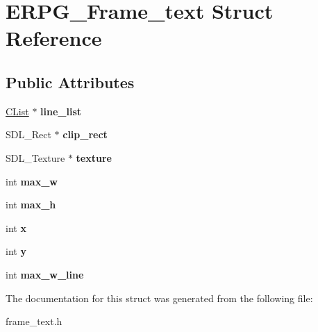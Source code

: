 \hypertarget{structERPG__Frame__text}{\section{E\-R\-P\-G\-\_\-\-Frame\-\_\-text Struct Reference}
\label{structERPG__Frame__text}
}
\subsection*{Public Attributes}
\begin{DoxyCompactItemize}
\item 
\hypertarget{structERPG__Frame__text_a578703ab0f77bb521e9c947e4c451767}{\hyperlink{structCList}{C\-List} $\ast$ {\bfseries line\-\_\-list}}\label{structERPG__Frame__text_a578703ab0f77bb521e9c947e4c451767}

\item 
\hypertarget{structERPG__Frame__text_a77dc3ae5ab6b63568da99b137ef8bd58}{S\-D\-L\-\_\-\-Rect $\ast$ {\bfseries clip\-\_\-rect}}\label{structERPG__Frame__text_a77dc3ae5ab6b63568da99b137ef8bd58}

\item 
\hypertarget{structERPG__Frame__text_adc1f31d49df6418034c23492cd90c4ec}{S\-D\-L\-\_\-\-Texture $\ast$ {\bfseries texture}}\label{structERPG__Frame__text_adc1f31d49df6418034c23492cd90c4ec}

\item 
\hypertarget{structERPG__Frame__text_a642b86beb7d36da42af57384b03312ee}{int {\bfseries max\-\_\-w}}\label{structERPG__Frame__text_a642b86beb7d36da42af57384b03312ee}

\item 
\hypertarget{structERPG__Frame__text_ae84ff76462a6add394892f101c0cb555}{int {\bfseries max\-\_\-h}}\label{structERPG__Frame__text_ae84ff76462a6add394892f101c0cb555}

\item 
\hypertarget{structERPG__Frame__text_a2e033b856f520b7a6df077674d37772c}{int {\bfseries x}}\label{structERPG__Frame__text_a2e033b856f520b7a6df077674d37772c}

\item 
\hypertarget{structERPG__Frame__text_a3e45e8c2196da25140924fe339c51be9}{int {\bfseries y}}\label{structERPG__Frame__text_a3e45e8c2196da25140924fe339c51be9}

\item 
\hypertarget{structERPG__Frame__text_a4b1ffaed8315b5bef96c14a3cbf12128}{int {\bfseries max\-\_\-w\-\_\-line}}\label{structERPG__Frame__text_a4b1ffaed8315b5bef96c14a3cbf12128}

\end{DoxyCompactItemize}


The documentation for this struct was generated from the following file\-:\begin{DoxyCompactItemize}
\item 
frame\-\_\-text.\-h\end{DoxyCompactItemize}

